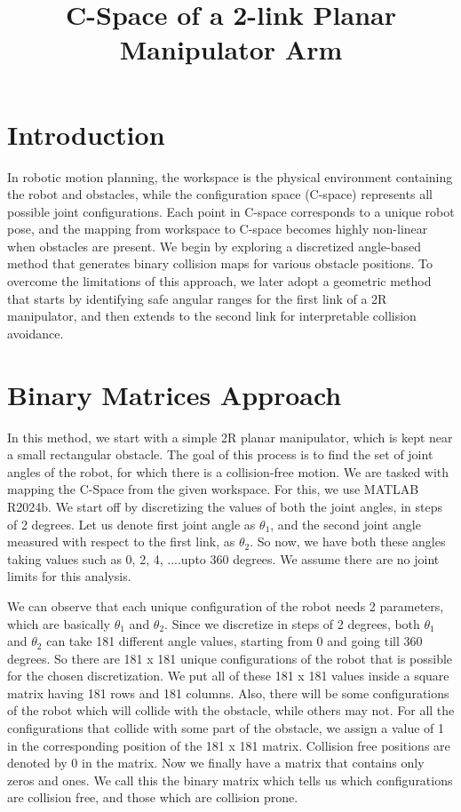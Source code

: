 \documentclass[12pt]{article}
\title{C-Space of a 2-link Planar Manipulator Arm}
\date{}
\begin{document}
\maketitle
\section*{Introduction}
In robotic motion planning, the workspace is the physical environment containing the robot and obstacles, while the configuration space (C-space) represents all possible joint configurations. Each point in C-space corresponds to a unique robot pose, and the mapping from workspace to C-space becomes highly non-linear when obstacles are present. We begin by exploring a discretized angle-based method that generates binary collision maps for various obstacle positions. To overcome the limitations of this approach, we later adopt a geometric method that starts by identifying safe angular ranges for the first link of a 2R manipulator, and then extends to the second link for interpretable collision avoidance.

\section{Binary Matrices Approach}
In this method, we start with a simple 2R planar manipulator, which is kept near a small rectangular obstacle. The goal of this process is to find the set of joint angles of the robot, for which there is a collision-free motion. We are tasked with mapping the C-Space from the given workspace. For this, we use MATLAB R2024b. We start off by discretizing the values of both the joint angles, in steps of 2 degrees. Let us denote first joint angle as $\theta_1$, and the second joint angle measured with respect to the first link, as $\theta_2$. So now, we have both these angles taking values such as 0, 2, 4, ....upto 360 degrees. We assume there are no joint limits for this analysis.

We can observe that each unique configuration of the robot needs 2 parameters, which are basically $\theta_1$ and $\theta_2$. Since we discretize in steps of 2 degrees, both $\theta_1$ and $\theta_2$ can take 181 different angle values, starting from 0 and going till 360 degrees. So there are 181 x 181 unique configurations of the robot that is possible for the chosen discretization. We put all of these 181 x 181 values inside a square matrix having 181 rows and 181 columns. Also, there will be some configurations of the robot which will collide with the obstacle, while others may not. For all the configurations that collide with some part of the obstacle, we assign a value of 1 in the corresponding position of the 181 x 181 matrix. Collision free positions are denoted by 0 in the matrix. Now we finally have a matrix that contains only zeros and ones. We call this the binary matrix which tells us which configurations are collision free, and those which are collision prone.
\end{document}
